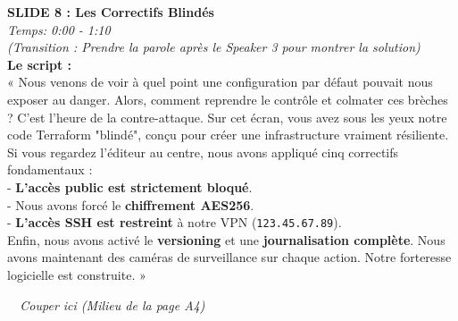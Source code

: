 \documentclass[a4paper,12pt]{article}
\begin{document}
\pagestyle{empty}
\Large


\begin{minipage}[t][0.45\textheight]{\textwidth}
\textbf{\huge SLIDE 8 : Les Correctifs Blindés}\\
\normalsize \textit{Temps: 0:00 - 1:10}\\

\large
\textit{(Transition : Prendre la parole après le Speaker 3 pour montrer la solution)}\\

\textbf{Le script :}\\
« Nous venons de voir à quel point une configuration par défaut pouvait nous exposer au danger. Alors, comment reprendre le contrôle et colmater ces brèches ? C'est l'heure de la contre-attaque. Sur cet écran, vous avez sous les yeux notre code Terraform "blindé", conçu pour créer une infrastructure vraiment résiliente.\\

Si vous regardez l'éditeur au centre, nous avons appliqué cinq correctifs fondamentaux :\\
- \textbf{L'accès public est strictement bloqué}.\\
- Nous avons forcé le \textbf{chiffrement AES256}.\\
- \textbf{L'accès SSH est restreint} à notre VPN (\texttt{123.45.67.89}).\\

Enfin, nous avons activé le \textbf{versioning} et une \textbf{journalisation complète}. Nous avons maintenant des caméras de surveillance sur chaque action. Notre forteresse logicielle est construite. »
\end{minipage}

\vspace*{\fill}
\begin{center}
\noindent\dotfill\textit{\small \ \ Couper ici (Milieu de la page A4)\ \ }\dotfill\\
\end{center}
\vspace*{\fill}
\end{document}
